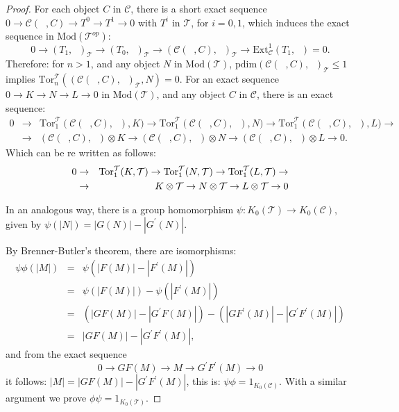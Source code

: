 \documentclass{amsart}
\theoremstyle{plain}
\numberwithin{equation}{section}
\begin{document}
\begin{proof}
For each object $C$ in $\mathcal{C}$, there is a short exact sequence $0\rightarrow \mathcal{C}(\;\;,C)\rightarrow T^{0}\rightarrow
T^{1}\rightarrow 0$ with $T^{i}$ in $\mathcal{T}$, for $i=0,1$, which
induces the exact sequence in $\mathrm{\mathrm{Mod}}(\mathcal{T}^{op})$:
\begin{equation*}
0\rightarrow (T_{1},\;\;)_{\mathcal{T}}\rightarrow (T_{0},\;\;)_{\mathcal{T}}\rightarrow (\mathcal{C}(\;\;,C),\;\;)_{\mathcal{T}}\rightarrow \mathrm{Ext}_{\mathcal{C}}^{1}(T_{1},\;\;)=0\text{.}
\end{equation*}Therefore: for $n>1$, and any object $N$ in $\mathrm{Mod}(\mathcal{T})$, $\mathrm{pdim}(\mathcal{C}(\;\;,C),\;\;)_{\mathcal{T}}\leq 1$ implies $\mathrm{Tor}_{n}^{\mathcal{T}}((\mathcal{C}(\;\;,C),\;\;)_{\mathcal{T}},N)=0$. For an exact sequence $0\rightarrow K\rightarrow N\rightarrow L\rightarrow
0$ in $\mathrm{\mathrm{Mod}}(\mathcal{T})$, and any object $C$ in $\mathcal{C}$, there is an exact sequence:
\begin{eqnarray*}
0 &\rightarrow &\mathrm{Tor}_{1}^{\mathcal{T}}(\mathcal{C}(\;\;,C),\;\;),K)\rightarrow \mathrm{Tor}_{1}^{\mathcal{T}}(\mathcal{C}(\;\;,C),\;\;),N)\rightarrow \mathrm{Tor}_{1}^{\mathcal{T}}(\mathcal{C}(\;\;,C),\;\;),L)\rightarrow \\
&\rightarrow &(\mathcal{C}(\;\;,C),\;\;)\otimes K\rightarrow (\mathcal{C}(\;\;,C),\;\;)\otimes N\rightarrow (\mathcal{C}(\;\;,C),\;\;)\otimes
L\rightarrow 0.
\end{eqnarray*}Which can be re written as follows:
\begin{eqnarray}
0 &\rightarrow &\mathrm{Tor}_{1}^{\mathcal{T}}(K,\mathcal{T})\rightarrow
\mathrm{Tor}_{1}^{\mathcal{T}}(N,\mathcal{T})\rightarrow \mathrm{Tor}_{1}^{\mathcal{T}}(L,\mathcal{T})\rightarrow  \notag  \label{GG2} \\
&\rightarrow &K\otimes \mathcal{T}\rightarrow N\otimes \mathcal{T}\rightarrow L\otimes \mathcal{T}\rightarrow 0
\end{eqnarray}

In an analogous way, there is a group homomorphism $\psi :K_{0}(\mathcal{T})\rightarrow K_{0}(\mathcal{C})$, given by $\psi (|N|)=|G(N)|-|G^{\prime
}(N)|$.

By Brenner-Butler's theorem, there are isomorphisms:
\begin{eqnarray*}
\psi \phi (|M|) &=&\psi (|F(M)|-|F^{\prime }(M)|) \\
&=&\psi (|F(M)|)-\psi (|F^{\prime }(M)|) \\
&=&(|GF(M)|-|G^{\prime }F(M)|)-(|GF^{\prime }(M)|-|G^{\prime }F^{\prime
}(M)|) \\
&=&|GF(M)|-|G^{\prime }F^{\prime }(M)|\text{,}
\end{eqnarray*}and from the exact sequence
\begin{equation*}
0\rightarrow GF(M)\rightarrow M\rightarrow G^{\prime }F^{\prime
}(M)\rightarrow 0
\end{equation*}it follows: $|M|=|GF(M)|-|G^{\prime }F^{\prime }(M)|$, this is: $\psi \phi
=1_{K_{0}(\mathcal{C})}$. With a similar argument we prove $\phi \psi
=1_{K_{0}(\mathcal{T})}$.
\end{proof}
\end{document}
